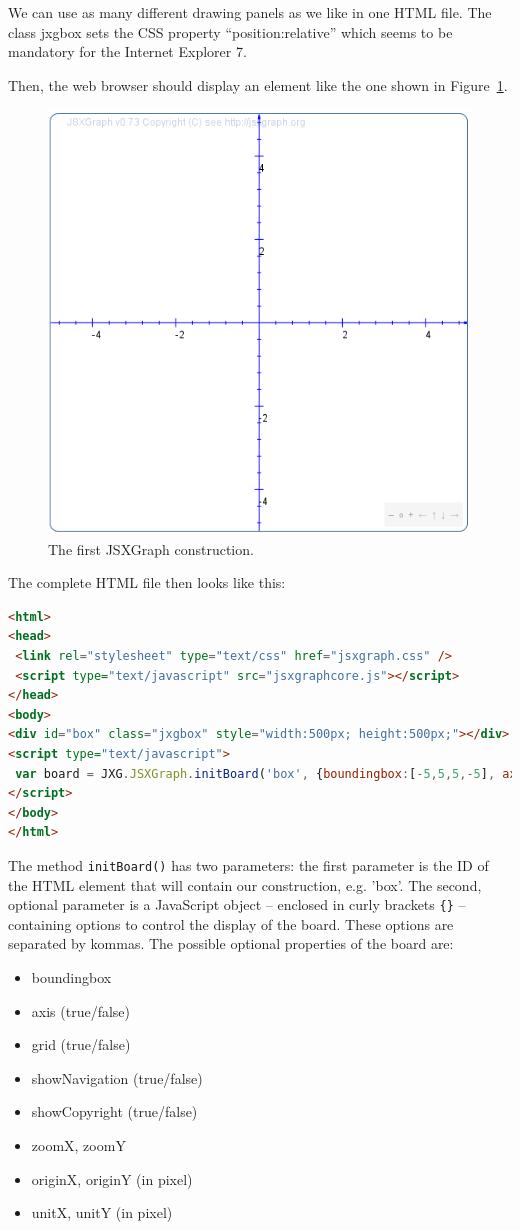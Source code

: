 We can use as many different drawing panels as we like in one HTML file. The class jxgbox sets the CSS property ``position:relative'' which seems to be mandatory for the Internet Explorer 7. 

Then, the web browser should display an element like the one shown in Figure~\ref{fig:1}.
\begin{figure}[htb]
\includegraphics[width=0.4\linewidth]{images/b2.png}
\caption{The first JSXGraph construction.}\label{fig:1}
\end{figure}

\noindent
The complete HTML file then looks like this:
\begin{fullwidth}\begin{lstlisting}[language=HTML]
<html>
<head>
 <link rel="stylesheet" type="text/css" href="jsxgraph.css" />
 <script type="text/javascript" src="jsxgraphcore.js"></script>
</head>
<body>
<div id="box" class="jxgbox" style="width:500px; height:500px;"></div>
<script type="text/javascript">
 var board = JXG.JSXGraph.initBoard('box', {boundingbox:[-5,5,5,-5], axis:true});
</script>
</body>
</html>
\end{lstlisting}\end{fullwidth}

\noindent
The method \lstinline|initBoard()| has two parameters: the first parameter is the ID of the HTML element
that will contain our construction, e.g. 'box'. The second, optional parameter is a JavaScript object -- enclosed
in curly brackets \lstinline|{}| -- containing options to control the display of the board. These options are
separated by kommas.
The possible optional properties of the board are:
\begin{itemize}
    \item boundingbox
    \item axis (true/false)
    \item grid (true/false)
    \item showNavigation (true/false)
    \item showCopyright (true/false) 
    \item zoomX, zoomY
    \item originX, originY (in pixel)
    \item unitX, unitY (in pixel)
\end{itemize}
